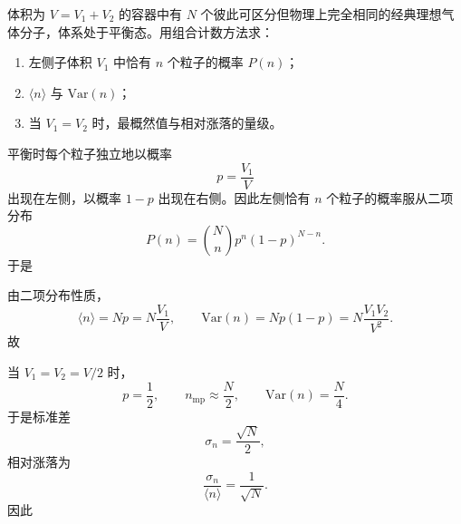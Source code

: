 \begin{question}[16分]
体积为 $V=V_1+V_2$ 的容器中有 $N$ 个彼此可区分但物理上完全相同的经典理想气体分子，体系处于平衡态。用组合计数方法求：
\begin{enumerate}[label=（\arabic*）,leftmargin=2.8em,itemsep=0.2em]
\item 左侧子体积 $V_1$ 中恰有 $n$ 个粒子的概率 $P(n)$；
\item $\langle n\rangle$ 与 $\mathrm{Var}(n)$；
\item 当 $V_1=V_2$ 时，最概然值与相对涨落的量级。
\end{enumerate}
\begin{solution}

平衡时每个粒子独立地以概率
\[
p=\frac{V_1}{V}
\]
出现在左侧，以概率 $1-p$ 出现在右侧。因此左侧恰有 $n$ 个粒子的概率服从二项分布
\[
P(n)=\binom{N}{n}p^n(1-p)^{N-n}.
\]
于是

由二项分布性质，
\[
\langle n\rangle=Np=N\frac{V_1}{V},
\qquad
\mathrm{Var}(n)=Np(1-p)=N\frac{V_1V_2}{V^2}.
\]
故

当 $V_1=V_2=V/2$ 时，
\[
p=\frac12,
\qquad
n_{\mathrm{mp}}\approx \frac{N}{2},
\qquad
\mathrm{Var}(n)=\frac{N}{4}.
\]
于是标准差
\[
\sigma_n=\frac{\sqrt N}{2},
\]
相对涨落为
\[
\frac{\sigma_n}{\langle n\rangle}=\frac{1}{\sqrt N}.
\]
因此
\end{solution}
\end{question}

